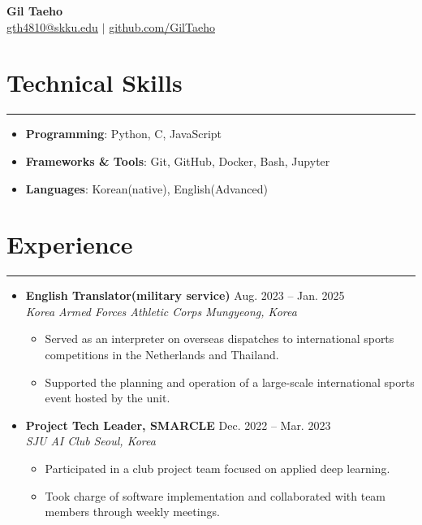 \documentclass[letterpaper, 10pt]{article}
\begin{document}
\begin{center}
 \textbf{\LARGE Gil Taeho} \\ \vspace{2pt}
 \href{mailto:yourmail@skku.edu}{\underline{gth4810@skku.edu}} $|$
 \href{https://github.com/GilTaeho}{\underline{github.com/GilTaeho}}
\end{center}
\section*{Technical Skills}
\hrule
\vspace{4pt}
\begin{itemize}
 \item[] \textbf{Programming}: Python, C, JavaScript %
 \item[] \textbf{Frameworks \& Tools}: Git, GitHub, Docker, Bash, Jupyter %
 \item[] \textbf{Languages}: Korean(native), English(Advanced) %
\end{itemize}
\section*{Experience}
\hrule
\vspace{4pt}
\begin{itemize}
 \item[]
 \textbf{English Translator(military service)} \hfill Aug. 2023 -- Jan. 2025 \\ %
 \textit{Korea Armed Forces Athletic Corps} \hfill \textit{Mungyeong, Korea}
 \begin{itemize}
 \item Served as an interpreter on overseas dispatches to international sports competitions in the Netherlands and Thailand.
 \item Supported the planning and operation of a large-scale international sports event hosted by the unit.
 \end{itemize}
 \item[]
 \textbf{Project Tech Leader, SMARCLE} \hfill Dec. 2022 -- Mar. 2023 \\ %
 \textit{SJU AI Club} \hfill \textit{Seoul, Korea}
 \begin{itemize}
 \item Participated in a club project team focused on applied deep learning.
 \item Took charge of software implementation and collaborated with team members through weekly meetings.
 \end{itemize}
\end{itemize}
\end{document}

